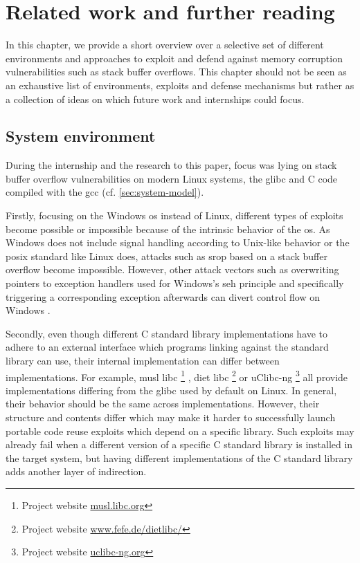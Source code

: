\chapter{Related work and further reading}
\label{chp:related-work}

In this chapter, we provide a short overview over a selective set of different environments and approaches to exploit and defend against memory corruption vulnerabilities such as stack buffer overflows.
This chapter should not be seen as an exhaustive list of environments, exploits and defense mechanisms but rather as a collection of ideas on which future work and internships could focus.

\section{System environment}
\label{sec:system-environment}

During the internship and the research to this paper, focus was lying on stack buffer overflow vulnerabilities on modern Linux systems, the \acl{glibc} and C code compiled with the \acl{gcc} (cf. \cref{sec:system-model}).

Firstly, focusing on the Windows \gls{os} instead of Linux, different types of exploits become possible or impossible because of the intrinsic behavior of the \gls{os}.
As Windows does not include signal handling according to Unix-like behavior or the \gls{posix} standard like Linux does, attacks such as \gls{srop} based on a stack buffer overflow become impossible.
However, other attack vectors such as overwriting pointers to exception handlers used for Windows's \gls{seh} principle and specifically triggering a corresponding exception afterwards can divert control flow on Windows \cite{CorelanTeam2009}.

Secondly, even though different C standard library implementations have to adhere to an external interface which programs linking against the standard library can use, their internal implementation can differ between implementations.
For example, musl libc%
	\footnote{Project website \href{https://musl.libc.org}{musl.libc.org}}%
, diet libc%
	\footnote{Project website \href{https://www.fefe.de/dietlibc/}{www.fefe.de/dietlibc/}}
or uClibc-ng%
	\footnote{Project website \href{https://uclibc-ng.org}{uclibc-ng.org}}
all provide implementations differing from the \gls{glibc} used by default on Linux.
In general, their behavior should be the same across implementations.
However, their structure and contents differ which may make it harder to successfully launch portable code reuse exploits which depend on a specific library.
Such exploits may already fail when a different version of a specific C standard library is installed in the target system, but having different implementations of the C standard library adds another layer of indirection.

